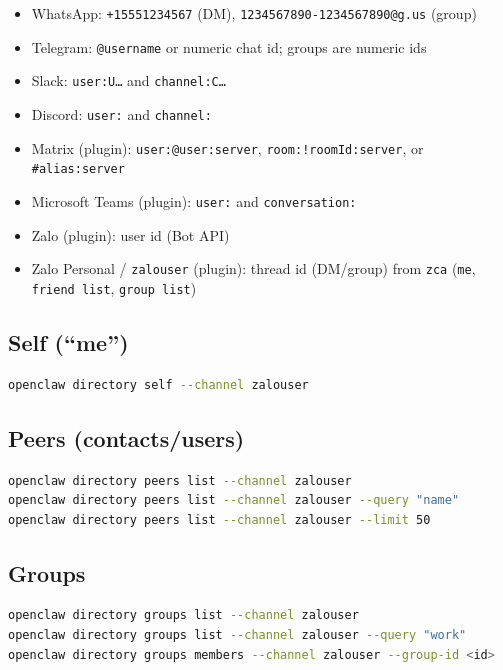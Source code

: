 \begin{itemize}
  \item WhatsApp: \texttt{+15551234567} (DM), \texttt{1234567890-1234567890@g.us} (group)
  \item Telegram: \texttt{@username} or numeric chat id; groups are numeric ids
  \item Slack: \texttt{user:U…} and \texttt{channel:C…}
  \item Discord: \texttt{user:} and \texttt{channel:}
  \item Matrix (plugin): \texttt{user:@user:server}, \texttt{room:!roomId:server}, or \texttt{\#alias:server}
  \item Microsoft Teams (plugin): \texttt{user:} and \texttt{conversation:}
  \item Zalo (plugin): user id (Bot API)
  \item Zalo Personal / \texttt{zalouser} (plugin): thread id (DM/group) from \texttt{zca} (\texttt{me}, \texttt{friend list}, \texttt{group list})
\end{itemize}


\subsection{Self (“me”)}


\begin{lstlisting}[language=bash]
openclaw directory self --channel zalouser
\end{lstlisting}


\subsection{Peers (contacts/users)}


\begin{lstlisting}[language=bash]
openclaw directory peers list --channel zalouser
openclaw directory peers list --channel zalouser --query "name"
openclaw directory peers list --channel zalouser --limit 50
\end{lstlisting}


\subsection{Groups}


\begin{lstlisting}[language=bash]
openclaw directory groups list --channel zalouser
openclaw directory groups list --channel zalouser --query "work"
openclaw directory groups members --channel zalouser --group-id <id>
\end{lstlisting}



